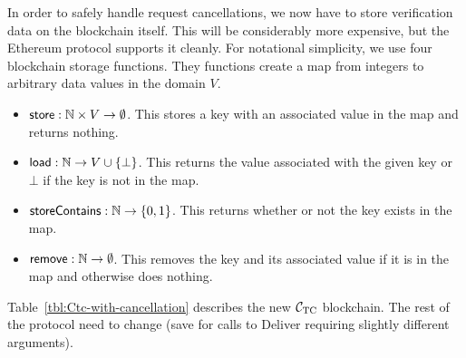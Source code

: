 In order to safely handle request cancellations, we now have to store verification data on the blockchain itself.
This will be considerably more expensive, but the Ethereum protocol supports it cleanly.
For notational simplicity, we use four blockchain storage functions.
They functions create a map from integers to arbitrary data values in the domain $V$.
\begin{itemize}
  \item {${\sf store} : \mathbb{N} \times V \to \emptyset$.}
    This stores a key with an associated value in the map and returns nothing.

  \item {${\sf load} : \mathbb{N} \to V \cup \{\bot\}$.}
    This returns the value associated with the given key or $\bot$ if the key is not in the map.

  \item {${\sf storeContains} : \mathbb{N} \to \{0, 1\}$.}
    This returns whether or not the key exists in the map.

  \item {${\sf remove} : \mathbb{N} \to \emptyset$.}
    This removes the key and its associated value if it is in the map and otherwise does nothing.
\end{itemize}
Table~\ref{tbl:Ctc-with-cancellation} describes the new $\mathcal{C}_\mathrm{TC}$ blockchain.
The rest of the protocol need to change (save for calls to Deliver requiring slightly different arguments).

